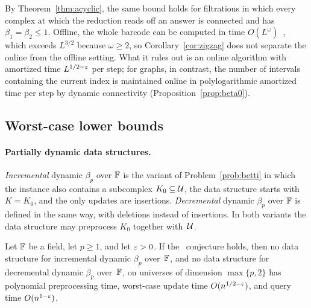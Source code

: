 By Theorem~\ref{thm:acyclic}, the same bound holds for filtrations in which every complex at which the reduction reads off an answer is connected and has $\beta_1=\beta_2\le1$.
Offline, the whole barcode can be computed in time $O(L^{\omega})$~\cite{MMS11}, which exceeds $L^{3/2}$ because $\omega\ge2$, so Corollary~\ref{cor:zigzag} does not separate the online from the offline setting.
What it rules out is an online algorithm with amortized time $L^{1/2-\varepsilon}$ per step; for graphs, in contrast, the number of intervals containing the current index is maintained online in polylogarithmic amortized time per step by dynamic connectivity (Proposition~\ref{prop:beta0}).

\subsection{Worst-case lower bounds}\label{sec:lower-worst}

\paragraph{Partially dynamic data structures.}
\emph{Incremental} dynamic $\beta_p$ over $\mathbb{F}$ is the variant of Problem~\ref{prob:betti} in which the instance also contains a subcomplex $K_0\subseteq\mathcal{U}$, the data structure starts with $K=K_0$, and the only updates are insertions.
\emph{Decremental} dynamic $\beta_p$ over $\mathbb{F}$ is defined in the same way, with deletions instead of insertions.
In both variants the data structure may preprocess $K_0$ together with~$\mathcal{U}$.

\begin{theorem}\label{thm:partial}
Let $\mathbb{F}$ be a field, let $p\ge1$, and let $\varepsilon>0$.
If the \OMv\ conjecture holds, then no data structure for incremental dynamic $\beta_p$ over~$\mathbb{F}$, and no data structure for decremental dynamic $\beta_p$ over~$\mathbb{F}$, on universes of dimension $\max\{p,2\}$ has polynomial preprocessing time, worst-case update time $O(n^{1/2-\varepsilon})$, and query time $O(n^{1-\varepsilon})$.
\end{theorem}

